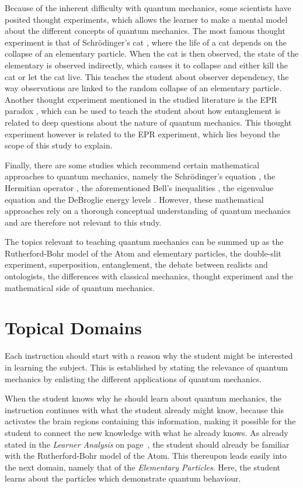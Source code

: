 \documentclass[11pt,twoside]{report} %
\begin{document}
Because of the inherent difficulty with quantum mechanics, some scientists have posited thought experiments, which allows the learner to make a mental model about the different concepts of quantum mechanics. The most famous thought experiment is that of Schrödinger's cat \cite{muller, velentzas}, where the life of a cat depends on the collapse of an elementary particle. When the cat is then observed, the state of the elementary is observed indirectly, which causes it to collapse and either kill the cat or let the cat live. This teaches the student about observer dependency, the way observations are linked to the random collapse of an elementary particle. Another thought experiment mentioned in the studied literature is the EPR paradox \cite{kuttner, muller, velentzas}, which can be used to teach the student about how entanglement is related to deep questions about the nature of quantum mechanics. This thought experiment however is related to the EPR experiment, which lies beyond the scope of this study to explain.

Finally, there are some studies which recommend certain mathematical approaches to quantum mechanics, namely the Schrödinger's equation \cite{muller, singh2}, the Hermitian operator \cite{singh2}, the aforementioned Bell's inequalities \cite{kuttner, muller}, the eigenvalue equation \cite{muller} and the DeBroglie energy levels \cite{dori, gianino, mckagan}. However, these mathematical approaches rely on a thorough conceptual understanding of quantum mechanics and are therefore not relevant to this study.

The topics relevant to teaching quantum mechanics can be summed up as the Rutherford-Bohr model of the Atom and elementary particles, the double-slit experiment, superposition, entanglement, the debate between realists and ontologists, the differences with classical mechanics, thought experiment and the mathematical side of quantum mechanics.

\chapter{Topical Domains}
\label{app:topicaldomains}

Each instruction should start with a reason why the student might be interested in learning the subject. This is established by stating the relevance of quantum mechanics by enlisting the different applications of quantum mechanics.

When the student knows why he should learn about quantum mechanics, the instruction continues with what the student already might know, because this activates the brain regions containing this information, making it possible for the student to connect the new knowledge with what he already knows. As already stated in the \emph{Learner Analysis} on page~\pageref{ch:learneranalysis}, the student should already be familiar with the Rutherford-Bohr model of the Atom. This thereupon leads easily into the next domain, namely that of the \emph{Elementary Particles}. Here, the student learns about the particles which demonstrate quantum behaviour.
\end{document}
